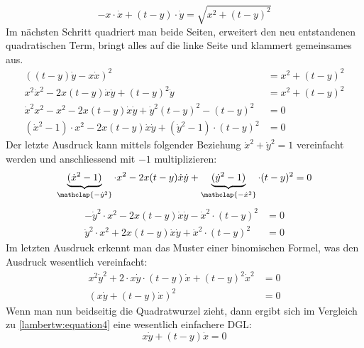 \begin{equation}
		-x \cdot \dot{x} + (t-y) \cdot \dot{y}
		= \sqrt{x^2 + (t-y)^2}
		\label{lambertw:equation4}
\end{equation}
Im nächsten Schritt quadriert man beide Seiten, erweitert den neu entstandenen quadratischen Term, bringt alles auf die linke Seite und klammert gemeinsames aus.
\begin{align*}
	((t-y) \dot{y} - x \dot{x})^2
	&= x^2 + (t-y)^2 \\
	x^2 \dot{x}^2 - 2x(t-y) \dot{x} \dot{y} + (t-y)^2 \dot{y}
	&= x^2 + (t-y)^2 \\
	\dot{x}^2 x^2 - x^2 - 2x(t-y) \dot{x} \dot{y} + \dot{y}^2 (t-y)^2 - (t-y)^2
	&= 0 \\
	(\dot{x}^2 - 1) \cdot x^2 - 2x(t-y) \dot{x} \dot{y} + (\dot{y}^2 - 1) \cdot (t-y)^2
	&= 0
\end{align*}
Der letzte Ausdruck kann mittels folgender Beziehung \(\dot{x}^2 + \dot{y}^2 = 1\) vereinfacht werden und anschliessend mit \(-1\) multiplizieren:
\[
	\underbrace{(\dot{x}^2 - 1)}_{\mathclap{-\dot{y}^2}} \cdot x^2 - 2x(t-y) \dot{x} \dot{y} + \underbrace{(\dot{y}^2 - 1)}_{\mathclap{-\dot{x}^2}} \cdot (t-y)^2
	= 0
\]
\begin{align*}
	- \dot{y}^2 \cdot x^2 - 2x(t-y) \dot{x} \dot{y} - \dot{x}^2 \cdot (t-y)^2
	&= 0 \\
	\dot{y}^2 \cdot x^2 + 2x(t-y) \dot{x} \dot{y} + \dot{x}^2 \cdot (t-y)^2
	&= 0
\end{align*}
Im letzten Ausdruck erkennt man das Muster einer binomischen Formel, was den Ausdruck wesentlich vereinfacht:
\begin{align*}
	x^2 \dot{y}^2  + 2 \cdot x \dot{y} \cdot (t-y) \dot{x}  + (t-y)^2 \dot{x}^2
	&= 0 \\
	(x \dot{y} + (t-y) \dot{x})^2
	&= 0
\end{align*}
Wenn man nun beidseitig die Quadratwurzel zieht, dann ergibt sich im Vergleich zu \eqref{lambertw:equation4} eine wesentlich einfachere DGL:
\begin{equation}
	x \dot{y} + (t-y) \dot{x}
	= 0
	\label{lambertw:equation5}
\end{equation}


